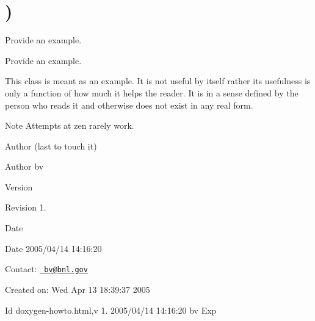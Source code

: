 \hypertarget{group__somewhere}{}\section{)}
\label{group__somewhere}


Provide an example.  


Provide an example. 

This class is meant as an example. It is not useful by itself rather its usefulness is only a function of how much it helps the reader. It is in a sense defined by the person who reads it and otherwise does not exist in any real form.

\begin{DoxyNote}{Note}
Attempts at zen rarely work.
\end{DoxyNote}
\begin{DoxyAuthor}{Author}
(last to touch it) 
\end{DoxyAuthor}
\begin{DoxyParagraph}{Author}
bv 
\end{DoxyParagraph}


\begin{DoxyVersion}{Version}

\end{DoxyVersion}
\begin{DoxyParagraph}{Revision}
1. 
\end{DoxyParagraph}


\begin{DoxyDate}{Date}

\end{DoxyDate}
\begin{DoxyParagraph}{Date}
2005/04/14 14\+:16\+:20 
\end{DoxyParagraph}


Contact\+: \href{mailto:bv@bnl.gov}{\texttt{ bv@bnl.\+gov}}

Created on\+: Wed Apr 13 18\+:39\+:37 2005

\begin{DoxyParagraph}{Id}
doxygen-\/howto.\+html,v 1. 2005/04/14 14\+:16\+:20 bv Exp 
\end{DoxyParagraph}

